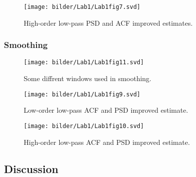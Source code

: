 \begin{figure}[!ht]
\centering
\texttt{[image: bilder/Lab1/Lab1fig7.svd]}
\caption{High-order low-pass PSD and ACF improved estimates.}
\label{fig:Lab1fig7}
\end{figure}


\subsubsection{Smoothing}

\begin{figure}[!ht]
\centering
\texttt{[image: bilder/Lab1/Lab1fig11.svd]}
\caption{Some diffrent windows used in smoothing.}
\label{fig:Lab1fig11}
\end{figure}

\begin{figure}[!ht]
\centering
\texttt{[image: bilder/Lab1/Lab1fig9.svd]}
\caption{Low-order low-pass ACF and PSD improved estimate.}
\label{fig:Lab1fig9}
\end{figure}

\begin{figure}[!ht]
\centering
\texttt{[image: bilder/Lab1/Lab1fig10.svd]}
\caption{High-order low-pass ACF and PSD improved estimate.}
\label{fig:Lab1fig10}
\end{figure}


\subsection{Discussion}

